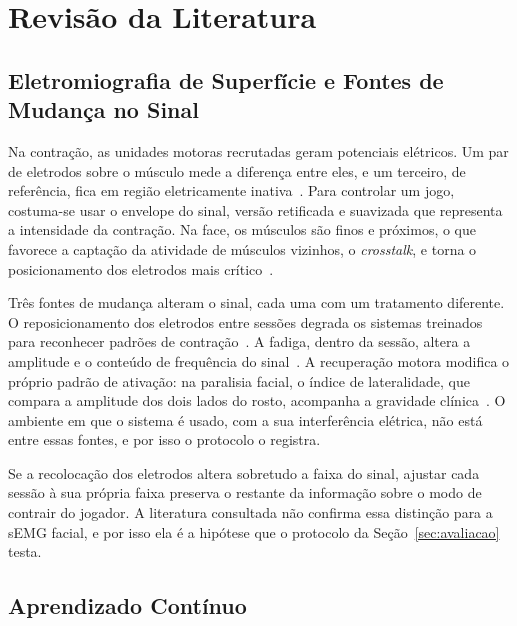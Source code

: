 \documentclass[runningheads]{llncs}
\begin{document}
\section{Revisão da Literatura}\label{sec:revisao}

\subsection{Eletromiografia de Superfície e Fontes de Mudança no Sinal}\label{sec:semg}

Na contração, as unidades motoras recrutadas geram potenciais elétricos. Um par de eletrodos sobre o músculo mede a diferença entre eles, e um terceiro, de referência, fica em região eletricamente inativa~\citep{hermens2000seniam}. Para controlar um jogo, costuma-se usar o envelope do sinal, versão retificada e suavizada que representa a intensidade da contração. Na face, os músculos são finos e próximos, o que favorece a captação da atividade de músculos vizinhos, o \textit{crosstalk}, e torna o posicionamento dos eletrodos mais crítico~\citep{franz2024facial}.

Três fontes de mudança alteram o sinal, cada uma com um tratamento diferente. O reposicionamento dos eletrodos entre sessões degrada os sistemas treinados para reconhecer padrões de contração~\citep{young2011electrode}. A fadiga, dentro da sessão, altera a amplitude e o conteúdo de frequência do sinal~\citep{cifrek2009fatigue}. A recuperação motora modifica o próprio padrão de ativação: na paralisia facial, o índice de lateralidade, que compara a amplitude dos dois lados do rosto, acompanha a gravidade clínica~\citep{machetanz2022facial}. O ambiente em que o sistema é usado, com a sua interferência elétrica, não está entre essas fontes, e por isso o protocolo o registra.

Se a recolocação dos eletrodos altera sobretudo a faixa do sinal, ajustar cada sessão à sua própria faixa preserva o restante da informação sobre o modo de contrair do jogador. A literatura consultada não confirma essa distinção para a sEMG facial, e por isso ela é a hipótese que o protocolo da Seção~\ref{sec:avaliacao} testa.

\subsection{Aprendizado Contínuo}\label{sec:aprendizado}
\end{document}
